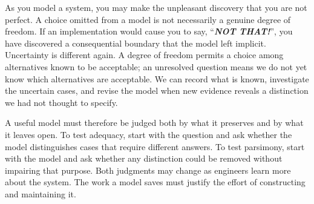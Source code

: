 
As you model a system, you may make the unpleasant discovery that you are not perfect. A choice omitted from a model is not necessarily a genuine degree of freedom. If an implementation would cause you to say, ``\textbf{\emph{NOT THAT!}}'', you have discovered a consequential boundary that the model left implicit. Uncertainty is different again. A degree of freedom permits a choice among alternatives known to be acceptable; an unresolved question means we do not yet know which alternatives are acceptable. We can record what is known, investigate the uncertain cases, and revise the model when new evidence reveals a distinction we had not thought to specify.


A useful model must therefore be judged both by what it preserves and by what it leaves open. To test adequacy, start with the question and ask whether the model distinguishes cases that require different answers. To test parsimony, start with the model and ask whether any distinction could be removed without impairing that purpose. Both judgments may change as engineers learn more about the system. The work a model saves must justify the effort of constructing and maintaining it.






